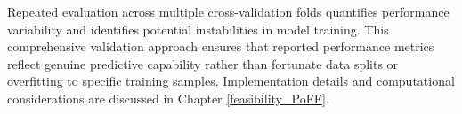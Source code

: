 Repeated evaluation across multiple cross-validation folds quantifies performance variability and identifies potential instabilities in model training. This comprehensive validation approach ensures that reported performance metrics reflect genuine predictive capability rather than fortunate data splits or overfitting to specific training samples. Implementation details and computational considerations are discussed in Chapter \ref{feasibility_PoFF}.
